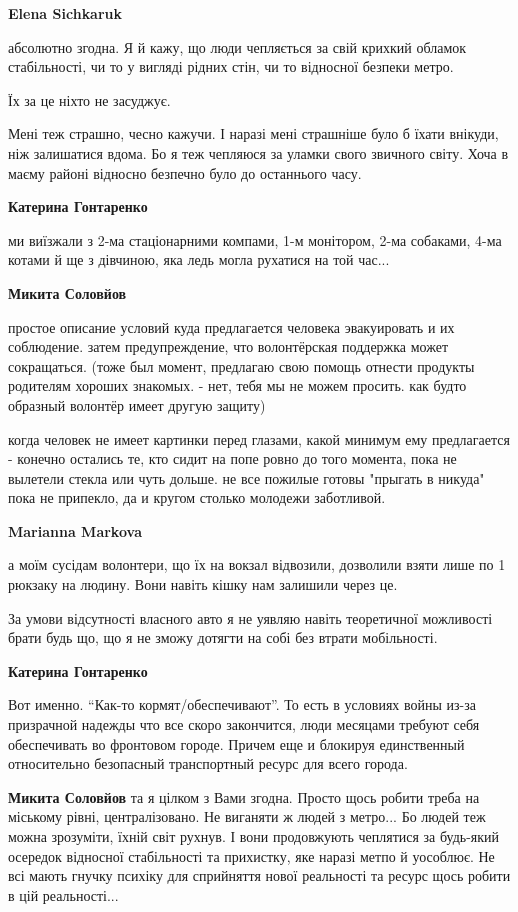 \begin{itemize}
\begin{itemize}
\textbf{Elena Sichkaruk} 

абсолютно згодна. Я й кажу, що люди чепляється за свій крихкий обламок
стабільності, чи то у вигляді рідних стін, чи то відносної безпеки метро.

Їх за це ніхто не засуджує.

Мені теж страшно, чесно кажучи. І наразі мені страшніше було б їхати внікуди,
ніж залишатися вдома. Бо я теж чепляюся за уламки свого звичного світу. Хоча в
маєму районі відносно безпечно було до останнього часу.

\textbf{Катерина Гонтаренко} 

ми виїзжали з 2-ма стаціонарними компами, 1-м монітором, 2-ма собаками, 4-ма
котами й ще з дівчиною, яка ледь могла рухатися на той час...

\textbf{Микита Соловйов} 

простое описание условий куда предлагается человека эвакуировать и их
соблюдение. затем предупреждение, что волонтёрская поддержка может сокращаться.
(тоже был момент, предлагаю свою помощь отнести продукты родителям хороших
знакомых. - нет, тебя мы не можем просить. как будто образный волонтёр имеет
другую защиту)

когда человек не имеет картинки перед глазами, какой минимум ему предлагается -
конечно остались те, кто сидит на попе ровно до того момента, пока не вылетели
стекла или чуть дольше. не все пожилые готовы "прыгать в никуда" пока не
припекло, да и кругом столько молодежи заботливой.

\textbf{Marianna Markova} 

а моїм сусідам волонтери, що їх на вокзал відвозили, дозволили взяти лише по 1
рюкзаку на людину. Вони навіть кішку нам залишили через це.

За умови відсутності власного авто я не уявляю навіть теоретичної можливості
брати будь що, що я не зможу дотягти на собі без втрати мобільності.

\textbf{Катерина Гонтаренко} 

Вот именно. \enquote{Как-то кормят/обеспечивают}. То есть в условиях войны из-за
призрачной надежды что все скоро закончится, люди месяцами требуют себя
обеспечивать во фронтовом городе. Причем еще и блокируя единственный
относительно безопасный транспортный ресурс для всего города.

\textbf{Микита Соловйов} та я цілком з Вами згодна.
Просто щось робити треба на міському рівні, централізовано.
Не виганяти ж людей з метро... Бо людей теж можна зрозуміти, їхній світ рухнув. І вони продовжують чеплятися за будь-який осередок відносної стабільності та прихистку, яке наразі метпо й уособлює. Не всі мають гнучку психіку для сприйняття нової реальності та ресурс щось робити в цій реальності...


\end{itemize}
\end{itemize}
